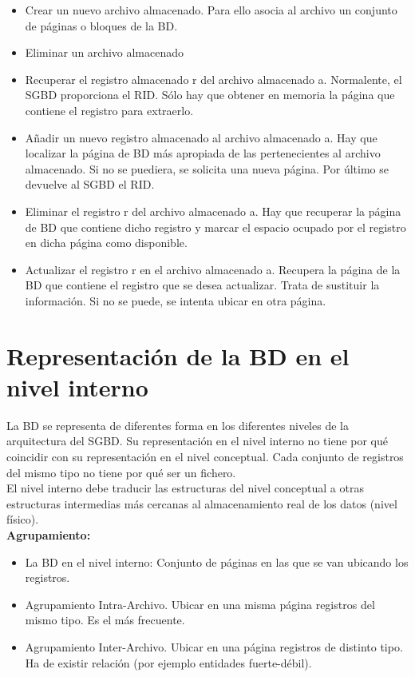 \documentclass[a4paper,11pt]{article}
\begin{document}
\begin{itemize}
\item Crear un nuevo archivo almacenado. Para ello asocia al archivo un conjunto de páginas o bloques de la BD.

\item Eliminar un archivo almacenado

\item Recuperar el registro almacenado r del archivo almacenado a. Normalente, el SGBD proporciona el RID. Sólo hay que obtener en memoria la página que contiene el registro para extraerlo.

\item Añadir un nuevo registro almacenado al archivo almacenado a. Hay que localizar la página de BD más apropiada de las pertenecientes al archivo almacenado. Si no se puediera, se solicita una nueva página. Por último se devuelve al SGBD el RID.

\item Eliminar el registro r del archivo almacenado a. Hay que recuperar la página de BD que contiene dicho registro y marcar el espacio ocupado por el registro en dicha página como disponible.

\item Actualizar el registro r en el archivo almacenado a. Recupera la página de la BD que contiene el registro que se desea actualizar. Trata de sustituir la información. Si no se puede, se intenta ubicar en otra página.
\end{itemize}

\section{Representación de la BD en el nivel interno}

La BD se representa de diferentes forma en los diferentes niveles de la arquitectura del SGBD. Su representación en el nivel interno no tiene por qué coincidir con su representación en el nivel conceptual. Cada conjunto de registros del mismo tipo no tiene por qué ser un fichero. \\

El nivel interno debe traducir las estructuras del nivel conceptual a otras estructuras intermedias más cercanas al almacenamiento real de los datos (nivel físico). \\

\textbf{Agrupamiento:}

\begin{itemize}
\item La BD en el nivel interno: Conjunto de páginas en las que se van ubicando los registros. 

\item Agrupamiento Intra-Archivo. Ubicar en una misma página registros del mismo tipo. Es el más frecuente.

\item Agrupamiento Inter-Archivo. Ubicar en una página registros de distinto tipo. Ha de existir relación (por ejemplo entidades fuerte-débil).
\end{itemize}
\end{document}

